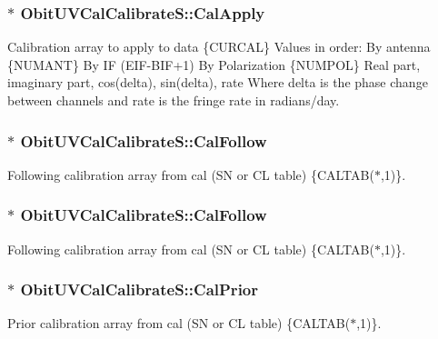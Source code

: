 \subsubsection{$\ast$ {\bf Obit\-UVCal\-Calibrate\-S::Cal\-Apply}}\label{structObitUVCalCalibrateS_o34}


Calibration array to apply to data \{CURCAL\} Values in order: By antenna \{NUMANT\} By IF (EIF-BIF+1) By Polarization \{NUMPOL\} Real part, imaginary part, cos(delta), sin(delta), rate Where delta is the phase change between channels and rate is the fringe rate in radians/day. 

\subsubsection{$\ast$ {\bf Obit\-UVCal\-Calibrate\-S::Cal\-Follow}}\label{structObitUVCalCalibrateS_o63}


Following calibration array from cal (SN or CL table) \{CALTAB($\ast$,1)\}. 

\subsubsection{$\ast$ {\bf Obit\-UVCal\-Calibrate\-S::Cal\-Follow}}\label{structObitUVCalCalibrateS_o36}


Following calibration array from cal (SN or CL table) \{CALTAB($\ast$,1)\}. 

\subsubsection{$\ast$ {\bf Obit\-UVCal\-Calibrate\-S::Cal\-Prior}}\label{structObitUVCalCalibrateS_o62}


Prior calibration array from cal (SN or CL table) \{CALTAB($\ast$,1)\}. 

